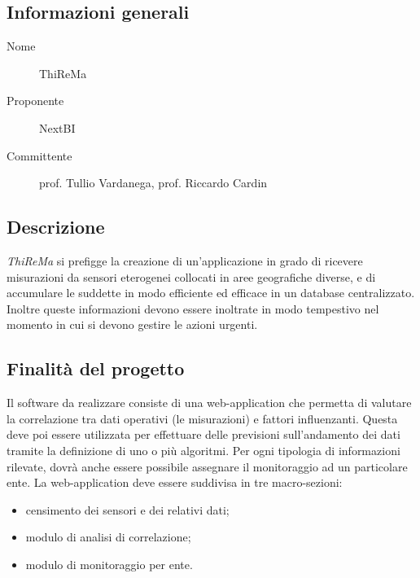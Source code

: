 \documentclass[../studio-di-fattibilita.tex]{subfiles}
\begin{document}
	\subsection{Informazioni generali}
	\label{subsec:informazioni_generali}
	\begin{description}
		\item[Nome] ThiReMa
		\item[Proponente] NextBI
		\item[Committente] prof. Tullio Vardanega, prof. Riccardo Cardin
	\end{description}

	\subsection{Descrizione}
	\label{subsec:descrizione}
	\textit{ThiReMa} si prefigge la creazione di un'applicazione in grado di ricevere misurazioni da sensori eterogenei collocati in aree geografiche diverse, e di accumulare le suddette in modo efficiente ed efficace in un database centralizzato. Inoltre queste informazioni devono essere inoltrate in modo tempestivo nel momento in cui si devono gestire le azioni urgenti.

	\subsection{Finalità del progetto}
	\label{subsec:finalita_del_progetto}
	Il software da realizzare consiste di una web-application che permetta di valutare la correlazione tra dati operativi (le misurazioni) e fattori influenzanti.
	Questa deve poi essere utilizzata per effettuare delle previsioni sull'andamento dei dati tramite la definizione di uno o più algoritmi.
	Per ogni tipologia di informazioni rilevate, dovrà anche essere possibile assegnare il monitoraggio ad un particolare ente.
	La web-application deve essere suddivisa in tre macro-sezioni:
	\begin{itemize}
		\item censimento dei sensori e dei relativi dati;
		\item modulo di analisi di correlazione;
		\item modulo di monitoraggio per ente.
	\end{itemize}
\end{document}

